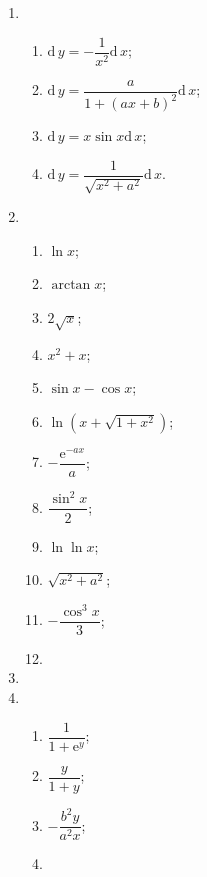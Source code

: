 \documentclass[a4paper, 11pt]{ctexart}
\newcommand{\dif}{\mathrm{d}\,}
\begin{document}
\pagestyle{empty}
\begin{enumerate}
    \item %
        \begin{enumerate}[(1)]
            \item %
                $\dif y = -\dfrac{1}{x^2}\dif x$;
            \item %
                $\dif y = \dfrac{a}{1 + (ax+b)^2}\dif x$;
            \item %
                $\dif y = x\sin x\dif x$;
            \item %
                $\dif y = \dfrac{1}{\sqrt{x^2 + a^2}}\dif x$.
        \end{enumerate}
    \item %
        \begin{enumerate}[(1)]
            \item %
                $\ln x$;
            \item %
                $\arctan x$;
            \item %
                $2\sqrt{x}$;
            \item %
                $x^2 + x$;
            \item %
                $\sin x - \cos x$;
            \item %
                $\ln(x + \sqrt{1+x^2})$;
            \item %
                $-\dfrac{\mathrm{e}^{-ax}}{a}$;
            \item %
                $\dfrac{\sin^2x}{2}$;
            \item %
                $\ln\ln x$;
            \item %
                $\sqrt{x^2 + a^2}$;
            \item %
                $-\dfrac{\cos^3x}{3}$;
            \item %
        \end{enumerate}
    \item %
    \item %
        \begin{enumerate}[(1)]
            \item %
                $\dfrac{1}{1 + \mathrm{e}^y}$;
            \item %
                $\dfrac{y}{1 + y}$;
            \item %
                $-\dfrac{b^2y}{a^2x}$;
            \item %

\end{enumerate}
\end{enumerate}
\end{document}
